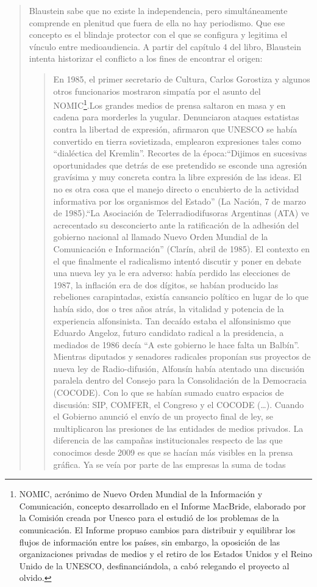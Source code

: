 \begin{quote}
Blaustein sabe que no existe la independencia, pero simultáneamente comprende en plenitud que fuera de ella no hay periodismo. Que ese concepto es el blindaje protector con el que se configura y legitima el vínculo entre medioaudiencia. A partir del capítulo 4 del libro, Blaustein intenta historizar el conflicto a los fines de encontrar el origen:

\begin{quote}
	En 1985, el primer secretario de Cultura, Carlos Gorostiza y algunos otros funcionarios mostraron simpatía por el asunto del NOMIC\footnote{NOMIC, acrónimo de Nuevo Orden Mundial de la Información y Comunicación, concepto desarrollado en el Informe MacBride, elaborado por la Comisión creada por Unesco para el estudió de los problemas de la comunicación. El Informe propuso cambios para distribuir y equilibrar los flujos de información entre los países, sin embargo, la oposición de las organizaciones privadas de medios y el retiro de los Estados Unidos y el Reino Unido de la UNESCO, desfinanciándola, a cabó relegando el proyecto al olvido.}.Los grandes medios de prensa saltaron en masa y en cadena para morderles la yugular. Denunciaron ataques estatistas contra la libertad de expresión, afirmaron que UNESCO se había convertido en tierra sovietizada, emplearon expresiones tales como ``dialéctica del Kremlin''. Recortes de la época:\enquote{Dijimos en sucesivas oportunidades que detrás de ese pretendido   se esconde una agresión gravísima y muy concreta contra la libre expresión de las ideas. El  no es otra cosa que el manejo directo o encubierto de la actividad informativa por los organismos del Estado} (La Nación, 7 de marzo de 1985).``La Asociación de Telerradiodifusoras Argentinas (ATA) ve acrecentado su desconcierto ante la ratificación de la adhesión del gobierno nacional al llamado Nuevo Orden Mundial de la Comunicación e Información'' (Clarín, abril de 1985). El contexto en el que finalmente el radicalismo intentó discutir y poner en debate una nueva ley ya le era adverso: había perdido las elecciones de 1987, la inflación era de dos dígitos, se habían producido las rebeliones carapintadas, existía cansancio político en lugar de lo que había sido, dos o tres años atrás, la vitalidad y potencia de la experiencia alfonsinista. Tan decaído estaba el alfonsinismo que Eduardo Angeloz, futuro candidato radical a la presidencia, a mediados de 1986 decía ``A este gobierno le hace falta un Balbín''. Mientras diputados y senadores radicales proponían sus proyectos de nueva ley de Radio-difusión, Alfonsín había atentado una discusión paralela dentro del Consejo para la Consolidación de la Democracia (COCODE). Con lo que se habían sumado cuatro espacios de discusión: SIP, COMFER, el Congreso y el COCODE (\dots). Cuando el Gobierno anunció el envío de un proyecto final de ley, se multiplicaron las presiones de las entidades de medios privados. La diferencia de las campañas institucionales respecto de las que conocimos desde 2009 es que se hacían más visibles en la prensa gráfica. Ya se veía por parte de las empresas la suma de todas 
\end{quote}
\end{quote}

